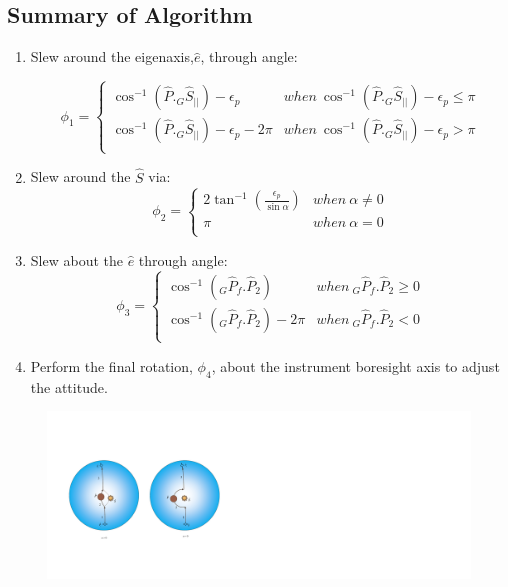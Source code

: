 \documentclass[letterpaper, preprint, paper,11pt]{AAS}	%
\begin{document}
	\subsection{Summary of Algorithm} 
	
	\begin{enumerate}
		\item Slew around the eigenaxis,$\hat{e}$, through angle:
		
		\begin{equation}\label{phi1}
		\phi_1=\left\{
		\begin{array}{ll}
		\cos^{-1}(\hat{P}._G\hat{S}_{||})-\epsilon_p& when\  \cos^{-1}(\hat{P}._G\hat{S}_{||})-\epsilon_p\leq \pi\\
		\cos^{-1}(\hat{P}._G\hat{S}_{||})-\epsilon_p-2\pi& when\ \cos^{-1}(\hat{P}._G\hat{S}_{||})-\epsilon_p>\pi\\
		\end{array}
		\right.
		\end{equation}
		\item Slew around the $\hat{S}$ via:
		\begin{equation}\label{phi2}
		\phi_2=\left\{
		\begin{array}{ll}
		2\tan^{-1}(\frac{\epsilon_p}{\sin\alpha})& when\  \alpha\neq 0\\
		\pi& when\ \alpha=0\\
		\end{array}
		\right.
		\end{equation}
		\item Slew about the $\hat{e}$ through angle:
		\begin{equation}\label{phi3}
		\phi_3=\left\{
		\begin{array}{ll}
		\cos^{-1}(_G\hat{P}_f.\hat{P}_2)& when\  _G\hat{P}_f.\hat{P}_2\geq 0\\
		\cos^{-1}(_G\hat{P}_f.\hat{P}_2)-2\pi& when\ _G\hat{P}_f.\hat{P}_2<0\\
		\end{array}
		\right.
		\end{equation}
		
		\item Perform the final rotation, $\phi_4$, about the instrument boresight axis to adjust the attitude. 
	\end{enumerate}
	\begin{figure}[H]
		\begin{center}
			\includegraphics[width=6in]{./Figures/SASSchematic3}
		\end{center}
	\end{figure}
	
\end{document}
